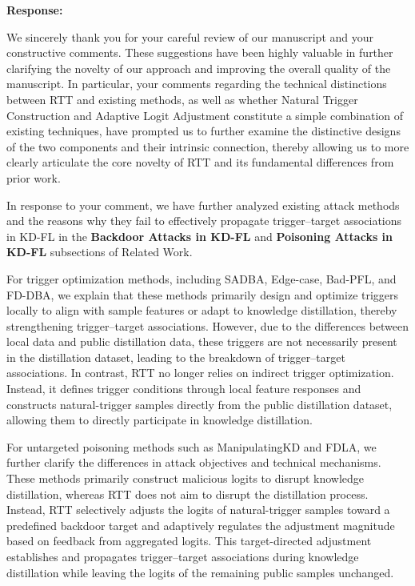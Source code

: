 \documentclass[11pt,a4paper]{article}
\newcommand{\manualindent}{\par\noindent\hspace*{1.5em}\ignorespaces}
\newcommand{\authorresponse}[1]{%
  {\bfseries\color{replyblue}Response:}\par
  #1\par\vspace{0.35em}%
}
\begin{document}
\authorresponse{\manualindent We sincerely thank you for your careful review of our manuscript and your constructive comments.
These suggestions have been highly valuable in further clarifying the novelty of our approach and improving the overall quality of the manuscript.
In particular, your comments regarding the technical distinctions between RTT and existing methods, as well as whether Natural Trigger Construction and Adaptive Logit Adjustment constitute a simple combination of existing techniques, have prompted us to further examine the distinctive designs of the two components and their intrinsic connection, thereby allowing us to more clearly articulate the core novelty of RTT and its fundamental differences from prior work.

\manualindent In response to your comment, we have further analyzed existing attack methods and the reasons why they fail to effectively propagate trigger--target associations in KD-FL in the \textbf{Backdoor Attacks in KD-FL} and \textbf{Poisoning Attacks in KD-FL} subsections of Related Work. 

\manualindent For trigger optimization methods, including SADBA, Edge-case, Bad-PFL, and FD-DBA, we explain that these methods primarily design and optimize triggers locally to align with sample features or adapt to knowledge distillation, thereby strengthening trigger--target associations.
However, due to the differences between local data and public distillation data, these triggers are not necessarily present in the distillation dataset, leading to the breakdown of trigger--target associations.
In contrast, RTT no longer relies on indirect trigger optimization.
Instead, it defines trigger conditions through local feature responses and constructs natural-trigger samples directly from the public distillation dataset, allowing them to directly participate in knowledge distillation.

\manualindent For untargeted poisoning methods such as ManipulatingKD and FDLA, we further clarify the differences in attack objectives and technical mechanisms. 
These methods primarily construct malicious logits to disrupt knowledge distillation, whereas RTT does not aim to disrupt the distillation process. 
Instead, RTT selectively adjusts the logits of natural-trigger samples toward a predefined backdoor target and adaptively regulates the adjustment magnitude based on feedback from aggregated logits. 
This target-directed adjustment establishes and propagates trigger--target associations during knowledge distillation while leaving the logits of the remaining public samples unchanged.

}
\end{document}
